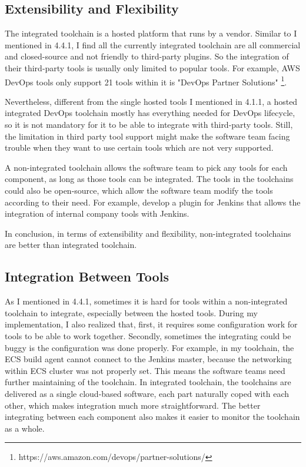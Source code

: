 \subsection{Extensibility and Flexibility}
The integrated toolchain is a hosted platform that runs by a vendor. Similar to I mentioned in 4.4.1, I find all the currently integrated toolchain are all commercial and closed-source and not friendly to third-party plugins. So the integration of their third-party tools is usually only limited to popular tools. For example, AWS DevOps tools only support 21 tools within it is "DevOps Partner Solutions" \footnote{https://aws.amazon.com/devops/partner-solutions/}.
\par
Nevertheless, different from the single hosted tools I mentioned in 4.1.1, a hosted integrated DevOps toolchain mostly has everything needed for DevOps lifecycle, so it is not mandatory for it to be able to integrate with third-party tools. Still, the limitation in third party tool support might make the software team facing trouble when they want to use certain tools which are not very supported.
\par
A non-integrated toolchain allows the software team to pick any tools for each component, as long as those tools can be integrated. The tools in the toolchains could also be open-source, which allow the software team modify the tools according to their need. For example, develop a plugin for Jenkins that allows the integration of internal company tools with Jenkins.
\par
In conclusion, in terms of extensibility and flexibility, non-integrated toolchains are better than integrated toolchain.
\subsection{Integration Between Tools}
As I mentioned in 4.4.1, sometimes it is hard for tools within a non-integrated toolchain to integrate, especially between the hosted tools. 
During my implementation, I also realized that, first, it requires some configuration work for tools to be able to work together. Secondly, sometimes the integrating could be buggy is the configuration was done properly. For example, in my toolchain, the ECS build agent cannot connect to the Jenkins master, because the networking within ECS cluster was not properly set. This means the software teams need further maintaining of the toolchain.
In integrated toolchain, the toolchains are delivered as a single cloud-based software, each part naturally coped with each other, which makes integration much more straightforward.
The better integrating between each component also makes it easier to monitor the toolchain as a whole.

